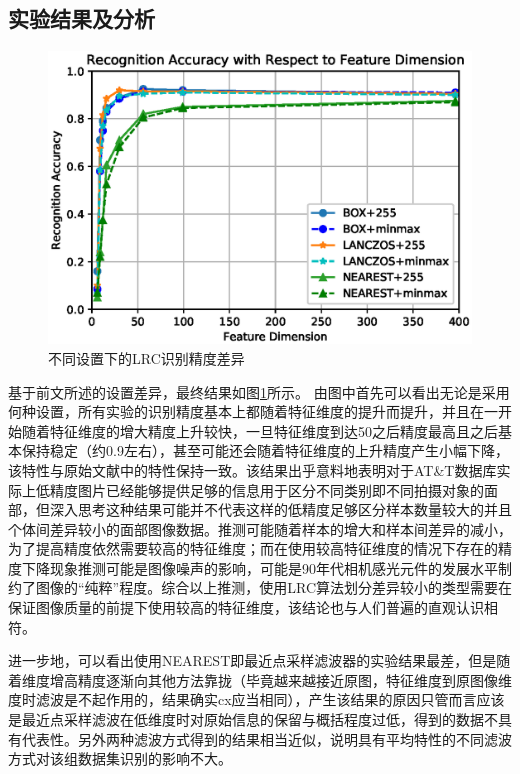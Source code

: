 \documentclass[UTF8]{ctexart}
\begin{document}
\subsection{实验结果及分析}
\begin{figure}[htbp]
    \centering
    \includegraphics[scale=0.7]{RA_Method.eps}
    \caption{不同设置下的LRC识别精度差异}\label{fig-result_method}
\end{figure}
基于前文所述的设置差异，最终结果如图\ref{fig-result_method}所示。
由图中首先可以看出无论是采用何种设置，所有实验的识别精度基本上都随着特征维度的提升而提升，并且在一开始随着特征维度的增大精度上升较快，一旦特征维度到达50之后精度最高且之后基本保持稳定（约0.9左右），甚至可能还会随着特征维度的上升精度产生小幅下降，该特性与原始文献中的特性保持一致。该结果出乎意料地表明对于AT\&T数据库实际上低精度图片已经能够提供足够的信息用于区分不同类别即不同拍摄对象的面部，但深入思考这种结果可能并不代表这样的低精度足够区分样本数量较大的并且个体间差异较小的面部图像数据。推测可能随着样本的增大和样本间差异的减小，为了提高精度依然需要较高的特征维度；而在使用较高特征维度的情况下存在的精度下降现象推测可能是图像噪声的影响，可能是90年代相机感光元件的发展水平制约了图像的“纯粹”程度。综合以上推测，使用LRC算法划分差异较小的类型需要在保证图像质量的前提下使用较高的特征维度，该结论也与人们普遍的直观认识相符。\par
进一步地，可以看出使用NEAREST即最近点采样滤波器的实验结果最差，但是随着维度增高精度逐渐向其他方法靠拢（毕竟越来越接近原图，特征维度到原图像维度时滤波是不起作用的，结果确实cx应当相同），产生该结果的原因只管而言应该是最近点采样滤波在低维度时对原始信息的保留与概括程度过低，得到的数据不具有代表性。另外两种滤波方式得到的结果相当近似，说明具有平均特性的不同滤波方式对该组数据集识别的影响不大。\par
\end{document}
